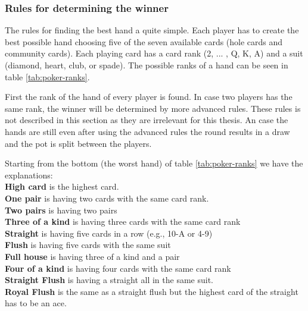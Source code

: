 \subsubsection*{Rules for determining the winner}
The rules for finding the best hand a quite simple. Each player has to create the best possible hand choosing five of the seven available cards (hole cards and community cards). Each playing card has a card rank (2, ... , Q, K, A) and a suit (diamond, heart, club, or spade). The possible ranks of a hand can be seen in table \ref{tab:poker-ranks}. 

First the rank of the hand of every player is found. In case two players has the same rank, the winner will be determined by more advanced rules. These rules is not described in this section as they are irrelevant for this thesis. An case the hands are still even after using the advanced rules the round results in a draw and the pot is split between the players.

Starting from the bottom (the worst hand) of table \ref{tab:poker-ranks} we have the explanations:\\
\textbf{High card} is the highest card.  \\
\textbf{One pair} is having two cards with the same card rank. \\
\textbf{Two pairs} is having two pairs\\
\textbf{Three of a kind} is having three cards with the same card rank \\
\textbf{Straight} is having five cards in a row (e.g., 10-A or 4-9)\\
\textbf{Flush} is having five cards with the same suit\\
\textbf{Full house} is having three of a kind and a pair\\
\textbf{Four of a kind} is having four cards with the same card rank \\
\textbf{Straight Flush} is having a straight all in the same suit.\\
\textbf{Royal Flush} is the same as a straight flush but the highest card of the straight has to be an ace.\\

